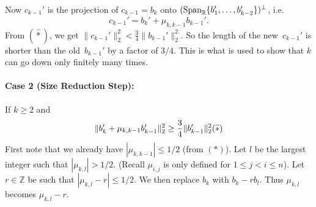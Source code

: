 \documentclass{Vorlesungstemplate_English} %
\begin{document}
\noindent Now $c_{k-1}'$ is the projection of $c_{k-1} = b_k$ onto $(\text{Span}_{\mathbb{R}}\{b_1', \dots, b_{k-2}'\})^\perp$, i.e.
\[ c_{k-1}' = b_k' + \mu_{k,k-1}b_{k-1}'. \]
From $(\widehat{*})$, we get $\|c_{k-1}'\|_2^2 < \frac{3}{4} \|b_{k-1}'\|_2^2$. So the length of the \glqq new\grqq \ $c_{k-1}'$ is shorter than the \glqq old\grqq \ $b_{k-1}'$ by a factor of $3/4$.
 This is what is used to show that $k$ can go down only finitely many times.

\paragraph{Case 2 (Size Reduction Step):} If $k \ge 2$ and
\[ \|b_k' + \mu_{k,k-1}b_{k-1}'\|_2^2 \ge \frac{3}{4} \|b_{k-1}'\|_2^2 \hfill (\widetilde{*}) \]
First note that we already have $|\mu_{k,k-1}| \le 1/2$ (from $(*)$). Let $l$ be the largest integer such that $|\mu_{k,l}| > 1/2$. (Recall $\mu_{i,j}$ is only defined for $1 \le j < i \le n$). Let $r \in \mathbb{Z}$ be such that $|\mu_{k,l} - r| \le 1/2$. We then replace $b_k$ with $b_k - rb_l$. Thus $\mu_{k,l}$ becomes $\mu_{k,l} - r$.
\end{document}
